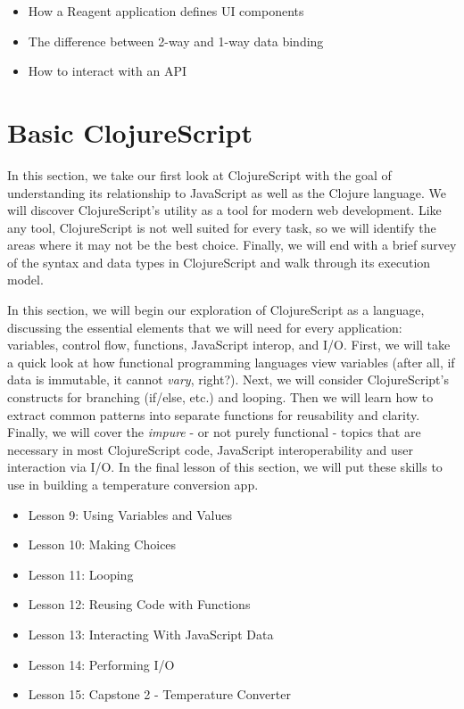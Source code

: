 \documentclass[10pt,twoside,openright]{memoir}
\begin{document}
\begin{itemize}
\tightlist
\item
  How a Reagent application defines UI components
\item
  The difference between 2-way and 1-way data binding
\item
  How to interact with an API
\end{itemize}

\cleardoublepage
{\let\newpage\relax\part{Basic ClojureScript}}

In this section, we take our first look at ClojureScript with the goal
of understanding its relationship to JavaScript as well as the Clojure
language. We will discover ClojureScript's utility as a tool for modern
web development. Like any tool, ClojureScript is not well suited for
every task, so we will identify the areas where it may not be the best
choice. Finally, we will end with a brief survey of the syntax and data
types in ClojureScript and walk through its execution model.

In this section, we will begin our exploration of ClojureScript as a
language, discussing the essential elements that we will need for every
application: variables, control flow, functions, JavaScript interop, and
I/O. First, we will take a quick look at how functional programming
languages view variables (after all, if data is immutable, it cannot
\emph{vary}, right?). Next, we will consider ClojureScript's constructs
for branching (if/else, etc.) and looping. Then we will learn how to
extract common patterns into separate functions for reusability and
clarity. Finally, we will cover the \emph{impure} - or not purely
functional - topics that are necessary in most ClojureScript code,
JavaScript interoperability and user interaction via I/O. In the final
lesson of this section, we will put these skills to use in building a
temperature conversion app.

\begin{itemize}
\tightlist
\item Lesson 9: Using Variables and Values
\item Lesson 10: Making Choices
\item Lesson 11: Looping
\item Lesson 12: Reusing Code with Functions
\item Lesson 13: Interacting With JavaScript Data
\item Lesson 14: Performing I/O
\item Lesson 15: Capstone 2 - Temperature Converter
\end{itemize}
\end{document}
